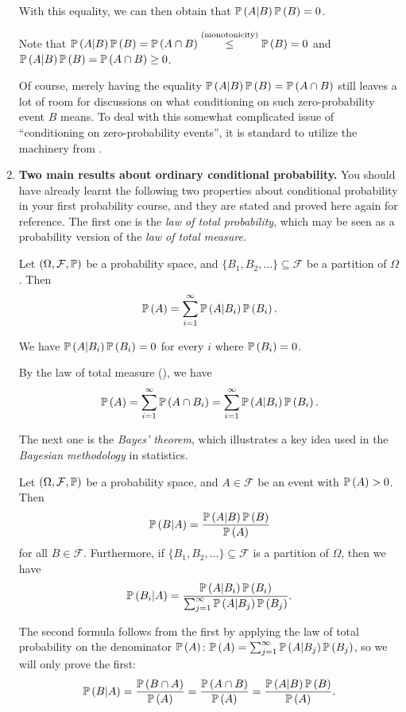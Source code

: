 \begin{enumerate}
With this equality, we can then obtain that \(\mathbb{P}\left(A|B\right)\mathbb{P}\left(B\right)=0\).

\begin{pf}
Note that
\(\mathbb{P}\left(A|B\right)\mathbb{P}\left(B\right)=\mathbb{P}\left(A\cap B\right)\overset{\text{(monotonicity)}}{\le}\mathbb{P}\left(B\right)=0\) and
\(\mathbb{P}\left(A|B\right)\mathbb{P}\left(B\right)=\mathbb{P}\left(A\cap B\right)\ge 0\).
\end{pf}

Of course, merely having the equality \(\mathbb{P}\left(A|B\right)\mathbb{P}\left(B\right)=\mathbb{P}\left(A\cap B\right)\)
still leaves a lot of room for discussions on what conditioning on such
zero-probability event \(B\) means.  To deal with this somewhat complicated
issue of ``conditioning on zero-probability events'', it is standard to utilize
the machinery from .

\item \textbf{Two main results about ordinary conditional probability.} You
should have already learnt the following two properties about conditional
probability in your first probability course, and they are stated and proved
here again for reference. The first one is the \emph{law of total probability},
which may be seen as a probability version of the \emph{law of total measure}.
\begin{theorem}
\label{thm:law-of-total-prob}
Let \((\Omega,\mathcal{F},\mathbb{P})\) be a probability space, and
\(\{B_1,B_2,\dotsc\}\subseteq \mathcal{F}\) be a partition of \(\Omega\). Then
\[
\mathbb{P}\left(A\right)=\sum_{i=1}^{\infty}\mathbb{P}\left(A|B_i\right)\mathbb{P}\left(B_i\right).
\]
\begin{note}
We have \(\mathbb{P}\left(A|B_i\right)\mathbb{P}\left(B_i\right)=0\) for every \(i\) where \(\mathbb{P}\left(B_i\right)=0\).
\end{note}
\end{theorem}
\begin{pf}
By the law of total measure (), we have
\[
\mathbb{P}\left(A\right)=\sum_{i=1}^{\infty}\mathbb{P}\left(A\cap B_i\right)=\sum_{i=1}^{\infty}\mathbb{P}\left(A|B_i\right)\mathbb{P}\left(B_i\right).
\]
\end{pf}

The next one is the \emph{Bayes' theorem}, which illustrates a key idea used in
the \emph{Bayesian methodology} in statistics.

\begin{theorem}
\label{thm:bayes}
Let \((\Omega,\mathcal{F},\mathbb{P})\) be a probability space, and
\(A\in\mathcal{F}\) be an event with \(\mathbb{P}\left(A\right)>0\). Then
\[
\mathbb{P}\left(B|A\right)=\frac{\mathbb{P}\left(A|B\right)\mathbb{P}\left(B\right)}{\mathbb{P}\left(A\right)}
\]
for all \(B\in\mathcal{F}\).
Furthermore, if \(\{B_1,B_2,\dotsc\}\subseteq \mathcal{F}\) is a partition of
\(\Omega\), then we have
\[
\mathbb{P}\left(B_i|A\right)=\frac{\mathbb{P}\left(A|B_i\right)\mathbb{P}\left(B_i\right)}{\sum_{j=1}^{\infty}\mathbb{P}\left(A|B_j\right)\mathbb{P}\left(B_j\right)}.
\]
\end{theorem}
\begin{pf}
The second formula follows from the first by applying the law of total
probability on the denominator \(\mathbb{P}\left(A\right)\):
\(\mathbb{P}\left(A\right)=\sum_{j=1}^{\infty}\mathbb{P}\left(A|B_j\right)\mathbb{P}\left(B_j\right)\), so we will only prove
the first:
\[
\mathbb{P}\left(B|A\right)=\frac{\mathbb{P}\left(B\cap A\right)}{\mathbb{P}\left(A\right)}=\frac{\mathbb{P}\left(A\cap B\right)}{\mathbb{P}\left(A\right)}
=\frac{\mathbb{P}\left(A|B\right)\mathbb{P}\left(B\right)}{\mathbb{P}\left(A\right)}.
\]
\end{pf}
\end{enumerate}
